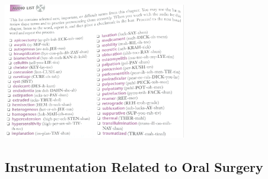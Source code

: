 \documentclass[
paper=landscape,
paper=160mm:90mm, %
fontsize=11pt, %
pagesize, %
parskip=half-, %
]{scrartcl} %
\theoremstyle{mythmstyle} %
\begin{document}
\begin{center} %
    \centering
    \captionsetup{labelformat=empty}
    \includegraphics[width=8cm]{p214.pdf}
\end{center}


\clearpage
\subsection{Instrumentation Related to Oral Surgery}
\end{document}
